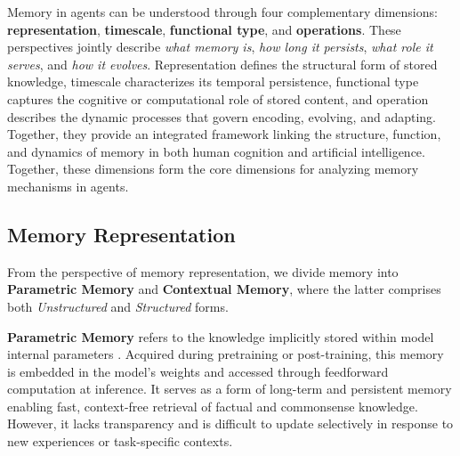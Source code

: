\documentclass[manuscript,screen]{acmart}
\begin{document}
Memory in agents can be understood through four complementary dimensions: \textbf{representation},  \textbf{timescale},  \textbf{functional type}, and  \textbf{operations}. These perspectives jointly describe \textit{what memory is}, \textit{how long it persists}, \textit{what role it serves}, and \textit{how it evolves}. Representation defines the structural form of stored knowledge, timescale characterizes its temporal persistence, functional type captures the cognitive or computational role of stored content, and operation describes the dynamic processes that govern encoding, evolving, and adapting. Together, they provide an integrated framework linking the structure, function, and dynamics of memory in both human cognition and artificial intelligence. Together, these dimensions form the core dimensions for analyzing memory mechanisms in agents.

\subsection{Memory Representation}
\label{sec:memory_taxonomy}
From the perspective of memory representation, we divide memory into \textbf{Parametric Memory} and \textbf{Contextual Memory}, where the latter comprises both \textit{Unstructured} and \textit{Structured} forms.

\textbf{Parametric Memory} refers to the knowledge implicitly stored within model internal parameters \citep{berges2024memory, wang2024wise, prashanth2024recite}. Acquired during pretraining or post-training, this memory is embedded in the model’s weights and accessed through feedforward computation at inference. It serves as a form of long-term and persistent memory enabling fast, context-free retrieval of factual and commonsense knowledge. However, it lacks transparency and is difficult to update selectively in response to new experiences or task-specific contexts.
\end{document}
